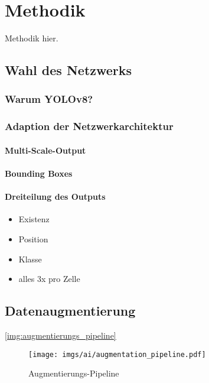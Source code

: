 
\section{Methodik}
\label{sec:ki:methodik}

Methodik hier.

\subsection{Wahl des Netzwerks}
\label{sec:netzwerk_wahl}


\subsubsection{Warum YOLOv8?}
\label{sec:warum_yolov8}


\subsubsection{Adaption der Netzwerkarchitektur}
\label{sec:yolo_adaption}

\paragraph{Multi-Scale-Output}

\paragraph{Bounding Boxes}

\paragraph{Dreiteilung des Outputs}

\begin{itemize}
    \item Existenz
    \item Position
    \item Klasse
    \item alles 3x pro Zelle
\end{itemize}


\subsection{Datenaugmentierung}
\label{sec:daten_augmentierung}

\autoref{img:augmentierungs_pipeline}

\begin{figure}
    \centering
    \texttt{[image: imgs/ai/augmentation\_pipeline.pdf]}
    \caption{Augmentierungs-Pipeline}
    \label{img:augmentierungs_pipeline}
\end{figure}

